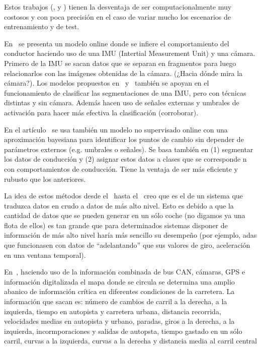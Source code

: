 Estos trabajos (\cite{sekizawa2007modeling}, \cite{terada2010multi} y \cite{bando2013unsupervised}) tienen la desventaja de ser computacionalmente muy costosos y con poca precisión en el caso de variar mucho los escenarios de entrenamiento y de test.

En~\cite{maye2011bayesian} se presenta un modelo online donde se infiere el comportamiento del conductor haciendo uso de una IMU (Intertial Measurement Unit) y una cámara. Primero de la IMU se sacan datos que se separan en fragmentos para luego relacionarlos con las imágenes obtenidas de la cámara. (\TODO ¿Hacia dónde mira la cámara?). Los modelos propuestos en~\cite{johnson2011driving} y~\cite{van2013driver} también se apoyan en el funcionamiento de clasificar las segmentaciones de una IMU, pero con técnicas distintas y sin cámara. Además hacen uso de señales externas y umbrales de activación para hacer más efectiva la clasificación (\TODO corroborar).

En el artículo~\cite{bender2015unsupervised} se usa también un modelo no supervisado online con una aproximación bayesiana para identificar los puntos de cambio sin depender de parámetros externos (e.g. umbrales o señales). Se basa también en (1) segmentar los datos de conducción y (2) asignar estos datos a clases que se corresponde n con comportamientos de conducción. Tiene la ventaja de ser más eficiente y rubusto que los anteriores.

La idea de estos métodos desde el~\cite{sekizawa2007modeling} hasta el~\cite{bender2015unsupervised} creo que es el de un sistema que traduzca datos en crudo a datos de más alto nivel. Esto es debido a que la cantidad de datos que se pueden generar en un sólo coche (no digamos ya una flota de ellos) es tan grande que para determinados sistemas disponer de información de más alto nivel haría más sencillo su desempeño (por ejemplo, \gls{adas} que funcionasen con datos de \enquote{adelantando} que sus valores de giro, aceleración en una ventana temporal).

En~\cite{satzoda2013towards}, haciendo uso de la información combinada de bus CAN, cámaras, GPS e información digitalizada el mapa donde se circula se determina una amplio abanico de información crítica en diferentes condiciones de la carretera. La información que sacan es: número de cambios de carril a la derecha, a la izquierda, tiempo en autopista y carretera urbana, distancia recorrida, velocidades medias en autopista y urbano, paradas, giros a la derecha, a la izquierda, incormporaciones y salidas de autopsta, tiempo gastado en un sólo carril, curvas a la izquierda, curvas a la derecha y distancia media al carril central


